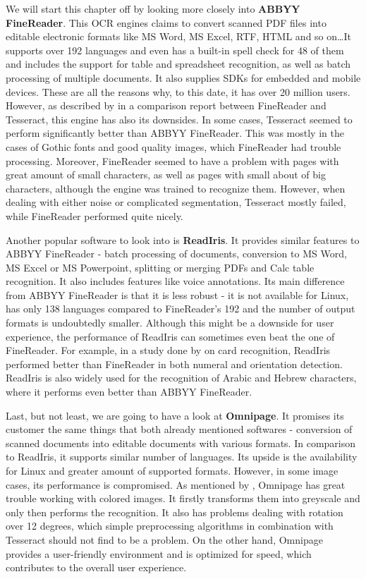 We will start this chapter off by looking more closely into \textbf{ABBYY FineReader}. This OCR engines claims to convert scanned PDF files into editable electronic formats like MS Word, MS Excel, RTF, HTML and so on\ldots It supports over 192 languages and even has a built-in spell check for 48 of them and includes the support for table and spreadsheet recognition, as well as batch processing of multiple documents. It also supplies SDKs for embedded and mobile devices. These are all the reasons why, to this date, it has over 20 million users. However, as described by \citet{comparisonTessABBYY} in a comparison report between FineReader and Tesseract, this engine has also its downsides. In some cases, Tesseract seemed to perform significantly better than ABBYY FineReader. This was mostly in the cases of Gothic fonts and good quality images, which FineReader had trouble processing. Moreover, FineReader seemed to have a problem with pages with great amount of small characters, as well as pages with small about of big characters, although the engine was trained to recognize them. However, when dealing with either noise or complicated segmentation, Tesseract mostly failed, while FineReader performed quite nicely.

Another popular software to look into is \textbf{ReadIris}. It provides similar features to ABBYY FineReader - batch processing of documents, conversion to MS Word, MS Excel or MS Powerpoint, splitting or merging PDFs and Calc table recognition. It also includes features like voice annotations. Its main difference from ABBYY FineReader is that it is less robust - it is not available for Linux, has only 138 languages compared to FineReader's 192 and the number of output formats is undoubtedly smaller. Although this might be a downside for user experience, the performance of ReadIris can sometimes even beat the one of FineReader. For example, in a study done by \citet{compABBYYIris} on card recognition, ReadIris performed better than FineReader in both numeral and orientation detection. ReadIris is also widely used for the recognition of Arabic and Hebrew characters, where it performs even better than ABBYY FineReader.

Last, but not least, we are going to have a look at \textbf{Omnipage}. It promises its customer the same things that both already mentioned softwares - conversion of scanned documents into editable documents with various formats. In comparison to ReadIris, it supports similar number of languages. Its upside is the availability for Linux and greater amount of supported formats. However, in some image cases, its performance is compromised. As mentioned by \citet{omnipageTest}, Omnipage has great trouble working with colored images. It firstly transforms them into greyscale and only then performs the recognition. It also has problems dealing with rotation over 12 degrees, which simple preprocessing algorithms in combination with Tesseract should not find to be a problem. On the other hand, Omnipage provides a user-friendly environment and is optimized for speed, which contributes to the overall user experience.


